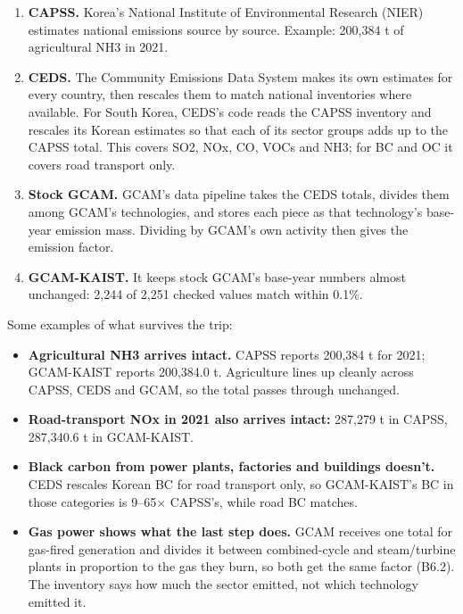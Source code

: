 \begin{enumerate}
  \begin{enumerate}
  \def\labelenumii{\arabic{enumii}.}
  \tightlist
  \item
    \textbf{CAPSS.} Korea's National Institute of Environmental Research (NIER)
    estimates national emissions source by source. Example: 200,384 t of
    agricultural NH3 in 2021.
  \item
    \textbf{CEDS.} The Community Emissions Data System makes its own estimates
    for every country, then rescales them to match national inventories where
    available. For South Korea, CEDS's code reads the CAPSS inventory and
    rescales its Korean estimates so that each of its sector groups adds up to
    the CAPSS total. This covers SO2, NOx, CO, VOCs and NH3; for BC and OC it
    covers road transport only.
  \item
    \textbf{Stock GCAM.} GCAM's data pipeline takes the CEDS totals, divides
    them among GCAM's technologies, and stores each piece as that technology's
    base-year emission mass. Dividing by GCAM's own activity then gives the
    emission factor.
  \item
    \textbf{GCAM-KAIST.} It keeps stock GCAM's base-year numbers almost
    unchanged: 2,244 of 2,251 checked values match within 0.1\%.
  \end{enumerate}

  Some examples of what survives the trip:

  \begin{itemize}
  \tightlist
  \item
    \textbf{Agricultural NH3 arrives intact.} CAPSS reports 200,384 t for 2021;
    GCAM-KAIST reports 200,384.0 t. Agriculture lines up cleanly across CAPSS,
    CEDS and GCAM, so the total passes through unchanged.
  \item
    \textbf{Road-transport NOx in 2021 also arrives intact:} 287,279 t in CAPSS,
    287,340.6 t in GCAM-KAIST.
  \item
    \textbf{Black carbon from power plants, factories and buildings doesn't.}
    CEDS rescales Korean BC for road transport only, so GCAM-KAIST's BC in those
    categories is 9--65$\times$ CAPSS's, while road BC matches.
  \item
    \textbf{Gas power shows what the last step does.} GCAM receives one total
    for gas-fired generation and divides it between combined-cycle and
    steam/turbine plants in proportion to the gas they burn, so both get the
    same factor (B6.2). The inventory says how much the sector emitted, not
    which technology emitted it.
  \end{itemize}


\end{enumerate}

